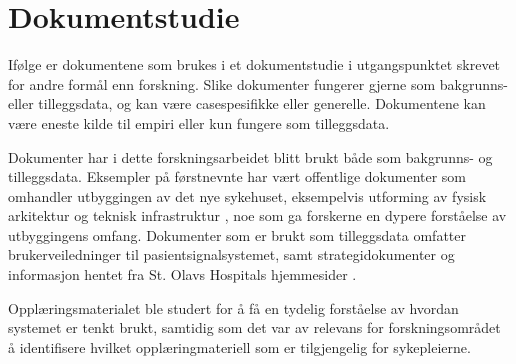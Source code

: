 \section{Dokumentstudie}
\label{sec:dokumentstudie}
Ifølge \citet{Tjora} er dokumentene som brukes i et dokumentstudie i utgangspunktet skrevet for andre formål enn forskning. Slike dokumenter fungerer gjerne som bakgrunns- eller tilleggsdata, og kan være casespesifikke eller generelle. Dokumentene kan være eneste kilde til empiri eller kun fungere som tilleggsdata. 

\noindent
Dokumenter har i dette forskningsarbeidet blitt brukt både som bakgrunns- og tilleggsdata. Eksempler på førstnevnte har vært offentlige dokumenter som omhandler utbyggingen av det nye sykehuset, eksempelvis utforming av fysisk arkitektur \citep{Aslaksen, Sintef-sengetun} og teknisk infrastruktur \citep{TU}, noe som ga forskerne en dypere forståelse av utbyggingens omfang. Dokumenter som er brukt som tilleggsdata omfatter brukerveiledninger til pasientsignalsystemet, samt strategidokumenter og informasjon hentet fra St. Olavs Hospitals hjemmesider \citep{BrukerveiledningforPasientsignal, BrukermanualforPasientsignalogPasientsignalapplikasjon, BrukerveiledningforTradlostelefon, styring13, stolavs}. 

\noindent
Opplæringsmaterialet ble studert for å få en tydelig forståelse av hvordan systemet er tenkt brukt, samtidig som det var av relevans for forskningsområdet å identifisere hvilket opplæringmateriell som er tilgjengelig for sykepleierne.